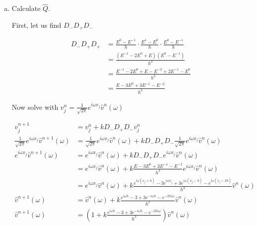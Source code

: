 \documentclass[11pt]{amsart}
\numberwithin{equation}{section}
\begin{document}
\begin{enumerate}[a)]
    \item Calculate $\hat{Q}$.  \\
          
          {\color{blue}
          First, let us find $D_- D_+ D_-$
          
          \begin{align}
              D_- D_+ D_+ & = \frac{E^0 - E^{-1}}{h} \cdot \frac{E^1 - E^0}{h} \cdot \frac{E^0 - E^{-1}}{h} \\
                          & = \frac{(E^{-1} - 2E^0 + E)(E^0 - E^{-1})}{h^3}                                 \\
                          & = \frac{E^{-1} - 2E^0 + E - E^{-2} + 2E^{-1} - E^0}{h^3}                        \\
                          & = \frac{E - 3E^0 + 3E^{-1} - E^{-2}}{h^3}
          \end{align}
          
          Now solve with $v^n_j = \frac{1}{\sqrt{2\pi}} e^{i\omega x_j} \hat v^n(\omega)$
          
          \begin{align}
              v_j^{n+1}                                                  & = v_j^n + kD_- D_+ D_- v_j^n                                                                                                                                     \\
              \frac{1}{\sqrt{2\pi}} e^{i\omega x_j} \hat v^{n+1}(\omega) & = \frac{1}{\sqrt{2\pi}} e^{i\omega x_j} \hat v^n(\omega) + kD_- D_+ D_- \frac{1}{\sqrt{2\pi}} e^{i\omega x_j} \hat v^n(\omega)                                   \\
              e^{i\omega x_j} \hat v^{n+1}(\omega)                       & =  e^{i\omega x_j} \hat v^n(\omega) + kD_- D_+ D_- e^{i\omega x_j} \hat v^n(\omega)                                                                              \\
                                                                         & =  e^{i\omega x_j} \hat v^n(\omega) + k \frac{E - 3E^0 + 3E^{-1} - E^{-2}}{h^3} e^{i\omega x_j} \hat v^n(\omega)                                                 \\
                                                                         & =  e^{i\omega x_j} \hat v^n(\omega) + k \frac{e^{i\omega (x_j + h)} - 3e^{i\omega x_j} + 3e^{i\omega (x_j - h)} - e^{i\omega (x_j - 2h)}}{h^3} \hat v^n(\omega)  \\
              \hat v^{n+1}(\omega)                                       & =  \hat v^n(\omega) + k \frac{e^{i\omega h} - 3 + 3e^{- i\omega h} - e^{-2h i\omega}}{h^3} \hat v^n(\omega)                                                      \\
              \hat v^{n+1}(\omega)                                       & =  \left(1 + k \frac{e^{i\omega h} - 3 + 3e^{- i\omega h} - e^{-2h i\omega}}{h^3} \right) \hat v^n(\omega)                                                      
          \end{align}
          
}
\end{enumerate}
\end{document}
